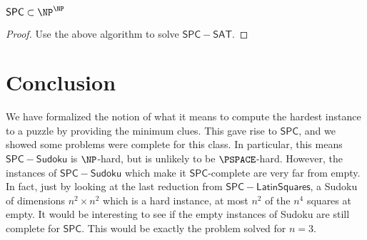 \documentclass[runningheads,a4paper]{llncs}
\begin{document}
\begin{proposition}
$\mathsf{SPC} \subset \NP^\NP$
\end{proposition}

\begin{proof}
Use the above algorithm to solve $\mathsf{SPC-SAT}$. 
\end{proof}

\section{Conclusion}

We have formalized the notion of what it means to compute the hardest instance to a puzzle by providing the minimum clues. This gave rise to $\mathsf{SPC}$, and we showed some problems were complete for this class. In particular, this means $\mathsf{SPC-Sudoku}$ is $\NP$-hard, but is unlikely to be $\PSPACE$-hard. However, the instances of $\mathsf{SPC-Sudoku}$ which make it $\mathsf{SPC}$-complete are very far from empty. In fact, just by looking at the last reduction from $\mathsf{SPC-Latin Squares}$, a Sudoku of dimensions $n^2 \times n^2$ which is a hard instance, at most $n^2$ of the $n^4$ squares at empty. It would be interesting to see if the empty instances of Sudoku are still complete for $\mathsf{SPC}$. This would be exactly the problem \cite{mcguire2012there} solved for $n = 3$. 



\end{document}
